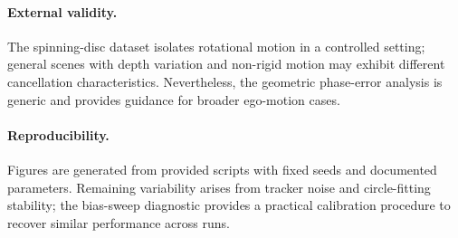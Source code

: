 \paragraph{External validity.} The spinning-disc dataset isolates rotational motion in a controlled setting; general scenes with depth variation and non-rigid motion may exhibit different cancellation characteristics. Nevertheless, the geometric phase-error analysis is generic and provides guidance for broader ego-motion cases.

\paragraph{Reproducibility.} Figures are generated from provided scripts with fixed seeds and documented parameters. Remaining variability arises from tracker noise and circle-fitting stability; the bias-sweep diagnostic provides a practical calibration procedure to recover similar performance across runs.
